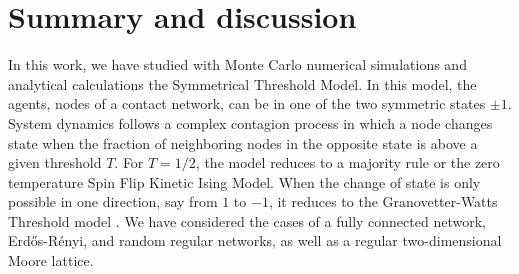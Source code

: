 
\section{\label{sec:Summary and Conclusions} Summary and discussion}


In this work, we have studied with Monte Carlo numerical simulations and analytical calculations the Symmetrical Threshold Model. In this model, the agents, nodes of a contact  network, can be in one of the two symmetric states $\pm 1$.  System dynamics follows a complex contagion process in which a node changes state when the fraction of neighboring nodes in the opposite state is above a given threshold $T$. For $T=1/2$, the model reduces to a majority rule or the zero temperature Spin Flip Kinetic Ising Model. When the change of state is only possible in one direction, say from $1$ to $-1$, it reduces to the Granovetter-Watts Threshold model \cite{granovetter-1978,watts-2002,Abella-2022-AME}. We have considered the cases of a fully connected network, Erd\H{o}s-Rényi, and random regular networks, as well as a regular two-dimensional Moore lattice. 


